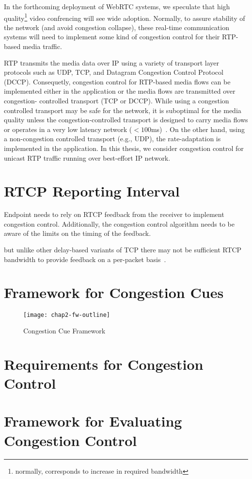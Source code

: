 In the forthcoming deployment of WebRTC systems, we speculate that high
quality\footnote{normally, corresponds to increase in required bandwidth}
video confrencing will see wide adoption. Normally, to assure stability of the
network (and avoid congestion collapse), these real-time communication systems
will need to implement some kind of congestion control for their RTP-based
media traffic.

RTP transmits the media data over IP using a variety of transport layer
protocols such as UDP, TCP, and Datagram Congestion Control Protocol (DCCP).
Consequetly, congestion control for RTP-based media flows can be implemented
either in the application or the media flows are transmitted over congestion-%
controlled transport (TCP or DCCP). While using a congestion controlled
transport may be safe for the network, it is suboptimal for the media quality
unless the congestion-controlled transport is designed to carry media flows or
operates in a very low latency network ($<100$ms)~\cite{Brosh:tcp-real-time}.
On the other hand, using a non-congestion controlled transport (e.g., UDP),
the rate-adaptation is implemented in the application.  In this thesis, we
consider congestion control for unicast RTP traffic running over best-effort
IP network.


\section{RTCP Reporting Interval}

Endpoint needs to rely on RTCP feedback from the receiver to implement
congestion control.  Additionally, the congestion control algorithm needs to
be aware of the limits on the timing of the feedback. 


but unlike other delay-based variants of TCP there
may not be sufficient RTCP bandwidth to provide feedback on a per-packet
basis~\cite{draft.rmcat.feedback}.



\section{Framework for Congestion Cues}
\label{fw.fw}


\begin{figure}
\texttt{[image: chap2-fw-outline]}
\caption{Congestion Cue Framework}
\label{fig:4:fw}
\end{figure}


\section{Requirements for Congestion Control}
\label{fw.cc.req}

\section{Framework for Evaluating Congestion Control}
\label{fw.cc.eval}

